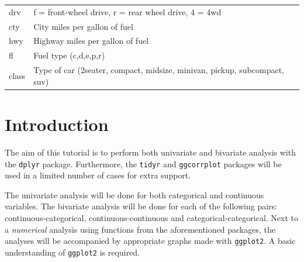 \documentclass[]{tufte-book}
\begin{document}
\begin{longtable}[]{@{}ll@{}}
\begin{minipage}[t]{0.35\columnwidth}
drv\strut
\end{minipage} & \begin{minipage}[t]{0.59\columnwidth}\raggedright
f = front-wheel drive, r = rear wheel drive, 4 = 4wd\strut
\end{minipage}\tabularnewline
\begin{minipage}[t]{0.35\columnwidth}\raggedright
cty\strut
\end{minipage} & \begin{minipage}[t]{0.59\columnwidth}\raggedright
City miles per gallon of fuel\strut
\end{minipage}\tabularnewline
\begin{minipage}[t]{0.35\columnwidth}\raggedright
hwy\strut
\end{minipage} & \begin{minipage}[t]{0.59\columnwidth}\raggedright
Highway miles per gallon of fuel\strut
\end{minipage}\tabularnewline
\begin{minipage}[t]{0.35\columnwidth}\raggedright
fl\strut
\end{minipage} & \begin{minipage}[t]{0.59\columnwidth}\raggedright
Fuel type (c,d,e,p,r)\strut
\end{minipage}\tabularnewline
\begin{minipage}[t]{0.35\columnwidth}\raggedright
class\strut
\end{minipage} & \begin{minipage}[t]{0.59\columnwidth}\raggedright
Type of car (2seater, compact, midsize, minivan, pickup, subcompact, suv)\strut
\end{minipage}\tabularnewline
\bottomrule
\end{longtable}

\hypertarget{introduction-1}{%
\section{Introduction}\label{introduction-1}}

The aim of this tutorial is to perform both univariate and bivariate analysis with the \texttt{dplyr} package. Furthermore, the \texttt{tidyr} and \texttt{ggcorrplot} packages will be used in a limited number of cases for extra support.

The univariate analysis will be done for both categorical and continuous variables. The bivariate analysis will be done for each of the following pairs: continuous-categorical, continuous-continuous and categorical-categorical. Next to a \emph{numerical} analysis using functions from the aforementioned packages, the analyses will be accompanied by appropriate graphs made with \texttt{ggplot2}. A basic understanding of \texttt{ggplot2} is required.
\end{document}
